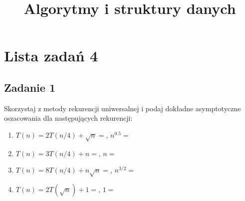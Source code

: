 \documentclass{article}
\begin{document}
\title{Algorytmy i struktury danych}
\author{}
\date{}
\maketitle

\section*{Lista zadań 4}

\subsection*{Zadanie 1}
Skorzystaj z metody rekurencji uniwersalnej i podaj dokładne asymptotyczne
oszacowania dla następujących rekurencji:
\begin{enumerate}[label=(\alph*)]
    \item $T(n) = 2T(n/4) + \sqrt{n} = $, $n^0.5 = $
    \item $T(n) = 3T(n/4) + n = $, $n = $
    \item $T(n) = 8T(n/4) + n\sqrt{n} = $, $n^{3/2} = $
    \item $T(n) = 2T(\sqrt{n}) + 1 = $, $1 = $
\end{enumerate}
\end{document}
